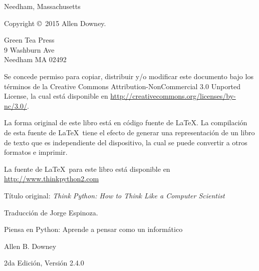 \documentclass[10pt]{book}
\newcommand{\thetitle}{Piensa en Python: Aprende a pensar como un informático}
\newcommand{\theversion}{2da Edición, Versión 2.4.0}
\newcommand{\thedate}{}
\begin{document}
\begin{latexonly}
\begin{flushright}
{\small Needham, Massachusetts}

\vfill

\end{flushright}


\pagebreak
\thispagestyle{empty}

{\small
Copyright \copyright ~2015 Allen Downey.


\vspace{0.2in}

\begin{flushleft}
Green Tea Press       \\
9 Washburn Ave        \\
Needham MA 02492
\end{flushleft}

Se concede permiso para copiar, distribuir y/o modificar este documento
bajo los términos de la Creative Commons Attribution-NonCommercial
3.0 Unported License, la cual está disponible en \url{http://creativecommons.org/licenses/by-nc/3.0/}.

La forma original de este libro está en código fuente de \LaTeX.  La compilación
de esta fuente de \LaTeX\ tiene el efecto de generar una representación de un libro
de texto que es independiente del dispositivo, la cual se puede convertir a otros formatos
e imprimir.

La fuente de \LaTeX\ para este libro está disponible en
\url{http://www.thinkpython2.com}

Título original: {\em Think Python: How to Think Like a Computer Scientist}

Traducción de Jorge Espinoza.

\vspace{0.2in}

} %

\end{latexonly}



\begin{htmlonly}


{\Large \thetitle}

{\large Allen B. Downey}

\theversion

\thedate

\setcounter{chapter}{-1}

\end{htmlonly}
\end{document}
